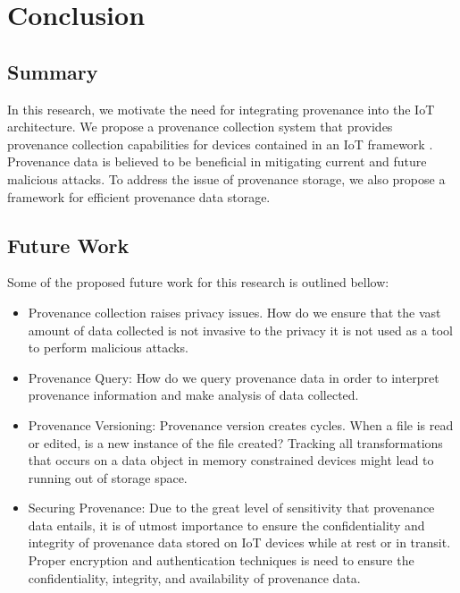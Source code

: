 
\chapter{Conclusion}

\section{Summary}
In this research, we motivate the need for integrating provenance into the IoT architecture. We propose a provenance collection system that provides provenance collection capabilities for devices contained in an IoT framework . Provenance data is believed to be beneficial in mitigating current and future malicious attacks. To address the issue of provenance storage, we also propose a framework for efficient provenance data storage.

\section{Future Work}

Some of the proposed future work for this research is outlined bellow:
\begin{itemize}

\item Provenance collection raises privacy issues. How do we ensure that the vast amount of data collected is not invasive to the privacy it is not used as a tool to perform malicious attacks.

\item Provenance Query: How do we query provenance data in order to interpret provenance information and make analysis of data collected.

\item Provenance Versioning: Provenance version creates cycles. When a file is read or edited, is a new instance of the file created? Tracking all transformations that occurs on a data object in memory constrained devices might lead to running out of storage space. 

\item Securing Provenance: Due to the great level of sensitivity that  provenance data entails, it is of utmost importance to ensure the confidentiality and integrity of provenance data stored on IoT devices while at rest or in transit. Proper encryption and authentication techniques \cite{Hasan:2009:CFP:1525908.1525909} is need to ensure the confidentiality, integrity, and availability of provenance data.

\end{itemize}

